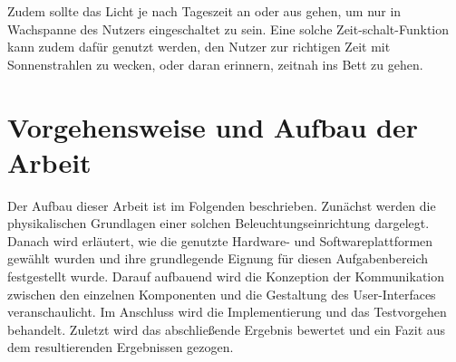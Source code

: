 Zudem sollte das Licht je nach Tageszeit an oder aus gehen, um nur in Wachspanne des Nutzers eingeschaltet zu sein. Eine solche Zeit-schalt-Funktion kann zudem dafür genutzt werden, den Nutzer zur richtigen Zeit mit \glqq Sonnenstrahlen\grqq{} zu wecken, oder daran erinnern, zeitnah ins Bett zu gehen.

\section{Vorgehensweise und Aufbau der Arbeit}

Der Aufbau dieser Arbeit ist im Folgenden beschrieben. Zunächst werden die physikalischen Grundlagen einer solchen Beleuchtungseinrichtung dargelegt. Danach wird erläutert, wie die genutzte Hardware- und Softwareplattformen gewählt wurden und ihre grundlegende Eignung für diesen Aufgabenbereich festgestellt wurde. Darauf aufbauend wird die Konzeption der Kommunikation zwischen den einzelnen Komponenten und die Gestaltung des User-Interfaces veranschaulicht. Im Anschluss wird die Implementierung und das Testvorgehen behandelt. Zuletzt wird das abschließende Ergebnis bewertet und ein Fazit aus dem resultierenden Ergebnissen gezogen.


